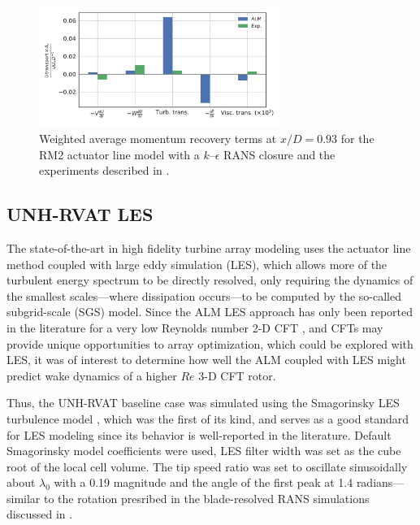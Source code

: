\documentclass[times]{weauth}
\begin{document}
\begin{figure}
    \centering

    \includegraphics[width=0.7\textwidth]{RM2-ALM_recovery-bar-chart}

    \caption{Weighted average momentum recovery terms at $x/D=0.93$ for the RM2
        actuator line model with a $k$--$\epsilon$ RANS closure and the experiments
        described in \cite{Bachant2016-RM2-paper}.}

    \label{fig:RM2-ALM-recovery}
\end{figure}


\subsection{UNH-RVAT LES}

The state-of-the-art in high fidelity turbine array modeling uses the actuator
line method coupled with large eddy simulation (LES), which allows more of the
turbulent energy spectrum to be directly resolved, only requiring the dynamics
of the smallest scales---where dissipation occurs---to be computed by the
so-called subgrid-scale (SGS) model. Since the ALM LES approach has only been
reported in the literature for a very low Reynolds number 2-D CFT
\cite{Shamsoddin2014}, and CFTs may provide unique opportunities to array
optimization, which could be explored with LES, it was of interest to determine
how well the ALM coupled with LES might predict wake dynamics of a higher $Re$
3-D CFT rotor.

Thus, the UNH-RVAT baseline case was simulated using the Smagorinsky LES
turbulence model \cite{Smagorinsky1963}, which was the first of its kind, and
serves as a good standard for LES modeling since its behavior is well-reported
in the literature. Default Smagorinsky model coefficients were used, LES filter
width was set as the cube root of the local cell volume. The tip speed ratio was
set to oscillate sinusoidally about $\lambda_0$ with a 0.19 magnitude and the
angle of the first peak at 1.4 radians---similar to the rotation presribed in
the blade-resolved RANS simulations discussed in \cite{Bachant2016-BR-CFD}.
\end{document}
